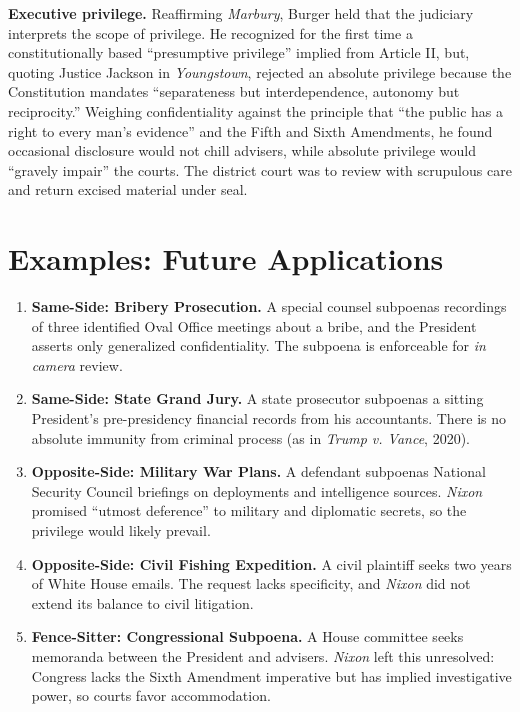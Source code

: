 \documentclass[12pt]{article}
\begin{document}
\textbf{Executive privilege.} Reaffirming \textit{Marbury}, Burger held that the judiciary interprets the scope of privilege. He recognized for the first time a constitutionally based ``presumptive privilege'' implied from Article II, but, quoting Justice Jackson in \textit{Youngstown}, rejected an absolute privilege because the Constitution mandates ``separateness but interdependence, autonomy but reciprocity.'' Weighing confidentiality against the principle that ``the public has a right to every man's evidence'' and the Fifth and Sixth Amendments, he found occasional disclosure would not chill advisers, while absolute privilege would ``gravely impair'' the courts. The district court was to review with scrupulous care and return excised material under seal.

\section{Examples: Future Applications}

\begin{enumerate}
\item \textbf{Same-Side: Bribery Prosecution.} A special counsel subpoenas recordings of three identified Oval Office meetings about a bribe, and the President asserts only generalized confidentiality. The subpoena is enforceable for \textit{in camera} review.
\item \textbf{Same-Side: State Grand Jury.} A state prosecutor subpoenas a sitting President's pre-presidency financial records from his accountants. There is no absolute immunity from criminal process (as in \textit{Trump v. Vance}, 2020).
\item \textbf{Opposite-Side: Military War Plans.} A defendant subpoenas National Security Council briefings on deployments and intelligence sources. \textit{Nixon} promised ``utmost deference'' to military and diplomatic secrets, so the privilege would likely prevail.
\item \textbf{Opposite-Side: Civil Fishing Expedition.} A civil plaintiff seeks two years of White House emails. The request lacks specificity, and \textit{Nixon} did not extend its balance to civil litigation.
\item \textbf{Fence-Sitter: Congressional Subpoena.} A House committee seeks memoranda between the President and advisers. \textit{Nixon} left this unresolved: Congress lacks the Sixth Amendment imperative but has implied investigative power, so courts favor accommodation.
\end{enumerate}
\end{document}

